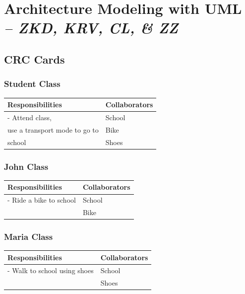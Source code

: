 \chapter{Architecture Modeling with UML \\
\small{\textit{-- ZKD, KRV, CL, \& ZZ}}
\label{Chapter::ArchitectureModeling}}

\section{CRC Cards}
\begin{description}
   
\subsection{Student Class}
\begin{center}
\begin{tabular}{|p{5cm}|p{5cm}|}
    \hline
    \textbf{Responsibilities} & \textbf{Collaborators} \\
    \hline
    - Attend class,  & School\\
      use a transport mode to go to & Bike \\
      school & Shoes \\
    \hline
\end{tabular}
\end{center}

\subsection{John Class}
\begin{center}
\begin{tabular}{|p{5cm}|p{5cm}|}
    \hline
    \textbf{Responsibilities} & \textbf{Collaborators} \\
    \hline
    - Ride a bike to school & School \\
    & Bike\\
    \hline
\end{tabular}
\end{center}

\subsection{Maria Class}
\begin{center}
\begin{tabular}{|p{5cm}|p{5cm}|}
    \hline
    \textbf{Responsibilities} & \textbf{Collaborators} \\
    \hline
    - Walk to school using shoes & School \\
     & Shoes \\
    \hline
\end{tabular}
\end{center}


\end{description}
